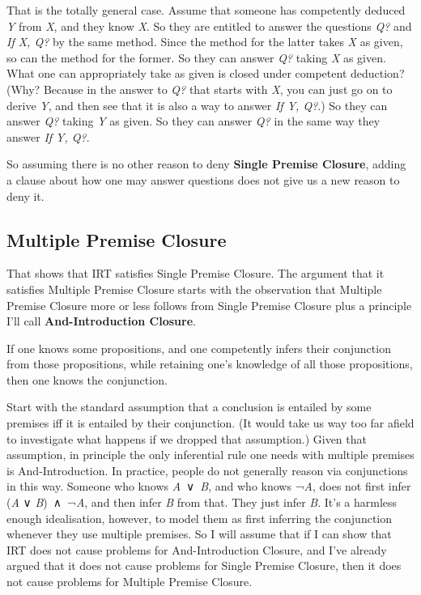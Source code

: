 \documentclass[
  10pt,
  letterpaper,
  twoside]{scrbook}
\providecommand{\tightlist}{%
  \setlength{\itemsep}{0pt}\setlength{\parskip}{0pt}}\usepackage{longtable,booktabs,array}
\begin{document}
That is the totally general case. Assume that someone has competently
deduced \emph{Y} from \emph{X}, and they know \emph{X}. So they are
entitled to answer the questions \emph{Q?} and \emph{If X, Q?} by the
same method. Since the method for the latter takes \emph{X} as given, so
can the method for the former. So they can answer \emph{Q?} taking
\emph{X} as given. What one can appropriately take as given is closed
under competent deduction? (Why? Because in the answer to \emph{Q?} that
starts with \emph{X}, you can just go on to derive \emph{Y}, and then
see that it is also a way to answer \emph{If Y, Q?}.) So they can answer
\emph{Q?} taking \emph{Y} as given. So they can answer \emph{Q?} in the
same way they answer \emph{If Y, Q?}.

So assuming there is no other reason to deny \textbf{Single Premise
Closure}, adding a clause about how one may answer questions does not
give us a new reason to deny it.

\subsection{Multiple Premise Closure}\label{sec-andintro}

That shows that IRT satisfies Single Premise Closure. The argument that
it satisfies Multiple Premise Closure starts with the observation that
Multiple Premise Closure more or less follows from Single Premise
Closure plus a principle I'll call \textbf{And-Introduction Closure}.

\begin{description}
\tightlist
\item[And-Introduction Closure]
If one knows some propositions, and one competently infers their
conjunction from those propositions, while retaining one's knowledge of
all those propositions, then one knows the conjunction.
\end{description}

Start with the standard assumption that a conclusion is entailed by some
premises iff it is entailed by their conjunction. (It would take us way
too far afield to investigate what happens if we dropped that
assumption.) Given that assumption, in principle the only inferential
rule one needs with multiple premises is And-Introduction. In practice,
people do not generally reason via conjunctions in this way. Someone who
knows \emph{A}~∨~\emph{B}, and who knows ¬\emph{A}, does not first infer
(\emph{A} ∨ \emph{B})~∧~¬\emph{A}, and then infer \emph{B} from that.
They just infer \emph{B}. It's a harmless enough idealisation, however,
to model them as first inferring the conjunction whenever they use
multiple premises. So I will assume that if I can show that IRT does not
cause problems for And-Introduction Closure, and I've already argued
that it does not cause problems for Single Premise Closure, then it does
not cause problems for Multiple Premise Closure.
\end{document}
